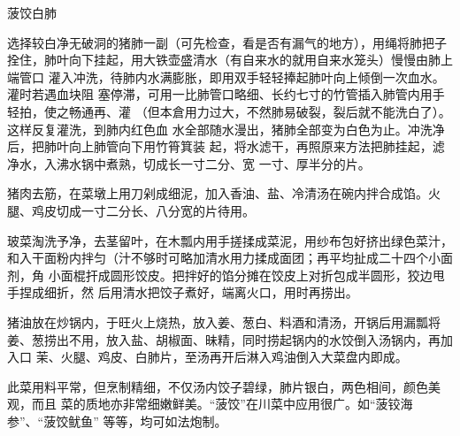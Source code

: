 \begin{recipe}[菠饺银肺]{菠饺白肺}

\ingredients


\preparation

\step 选择较白净无破洞的猪肺一副（可先检查，看是否有漏气的地方），用绳将肺把子
拴住，肺叶向下挂起，用大铁壶盛清水（有自来水的就用自来水笼头）慢慢由肺上端管口
灌入冲洗，待肺内水满膨胀，即用双手轻轻捧起肺叶向上倾倒一次血水。灌时若遇血块阻
塞停滞，可用一比肺管口略细、长约七寸的竹管插入肺管内用手轻拍，使之畅通再、灌
（但本倉用力过大，不然肺易破裂，裂后就不能洗白了）。这样反复灌洗，到肺内红色血
水全部随水漫出，猪肺全部变为白色为止。冲洗净后，把肺叶向上肺管向下用竹筲箕装
起，将水滤干，再照原来方法把肺挂起，滤净水，入沸水锅中煮熟，切成长一寸二分、宽
一寸、厚半分的片。

\step 猪肉去筋，在菜墩上用刀剁成细泥，加入香油、盐、冷清汤在碗内拌合成馅。火
腿、鸡皮切成一寸二分长、八分宽的片待用。

\step 玻菜淘洗予净，去茎留叶，在木瓢内用手搓揉成菜泥，用纱布包好挤出绿色菜汁，
和入干面粉内拌匀（汁不够时可略加清水用力揉成面团；再平均扯成二十四个小面剂，角
小面棍扞成圆形饺皮。把拌好的馅分摊在饺皮上对折包成半圆形，狡边甩手捏成细折，然
后用清水把饺子煮好，端离火口，用时再捞出。

\step 猪油放在炒锅内，于旺火上烧热，放入姜、葱白、料酒和清汤，开锅后用漏瓢将
姜、葱捞出不用，放入盐、胡椒面、昧精，同时捞起锅内的水饺倒入汤锅内，再加入口
茉、火腿、鸡皮、白肺片，至汤再开后淋入鸡油倒入大菜盘内即成。

\features

此菜用料平常，但烹制精细，不仅汤内饺子碧绿，肺片银白，两色相间，颜色美观，而且
菜的质地亦非常细嫩鲜美。“菠饺”在川菜中应用很广。如“菠铰海参”、“菠饺鱿鱼”
等等，均可如法炮制。

\end{recipe}

